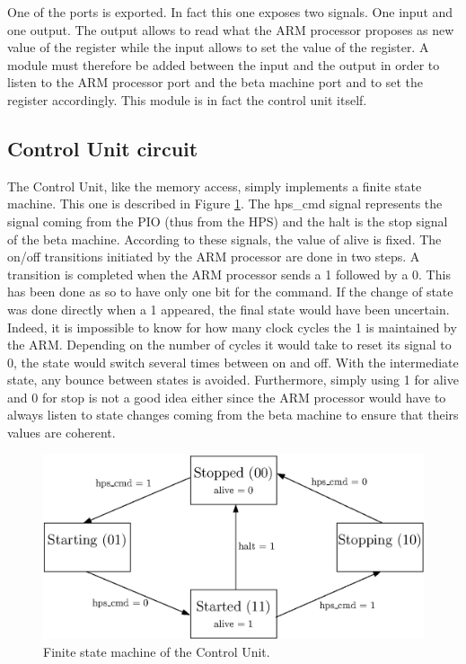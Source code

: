 One of the ports is exported. In fact this one exposes two signals. One input and one output. The 
output allows to read what the ARM processor proposes as new value of the register while the input 
allows to set the value of the register. A module must therefore be added between the input and the 
output in order to listen to the ARM processor port and the beta machine port and to set the 
register accordingly. This module is in fact the control unit itself.

\subsection{Control Unit circuit}

The Control Unit, like the memory access, simply implements a finite state machine. This one is 
described in Figure \ref{fig:ctrlu/fsm}. The hps\_cmd signal represents the signal coming from the 
PIO (thus from the HPS) and the halt is the stop signal of the beta machine. According to these 
signals, the value of alive is fixed. The on/off transitions initiated by the ARM processor are 
done in two steps. A transition is completed when the ARM processor sends a 1 followed by a 0. This 
has been done as so to have only one bit for the command. If the change of state was done directly 
when a 1 appeared, the final state would have been uncertain. Indeed, it is impossible to know for 
how many clock cycles the 1 is maintained by the ARM. Depending on the number of cycles it would 
take to reset its signal to 0, the state would switch several times between on and off. With 
the intermediate state, any bounce between states is avoided. Furthermore, simply using 1 for alive and 0 for
stop is not a good idea either since the ARM processor would have to always listen to state changes
coming from the beta machine to ensure that theirs values are coherent.

\begin{figure}[ht!]
    \center
    \includegraphics[scale=0.8]{"Chapter5-MAU_CTRLU/res/ctrlu_fsm"}
    \caption{Finite state machine of the Control Unit.}
    \label{fig:ctrlu/fsm}
\end{figure}

